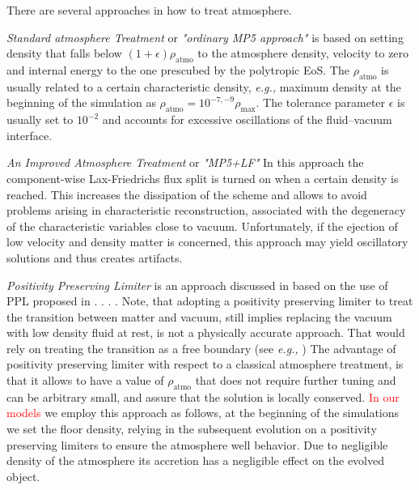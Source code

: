 There are several approaches in how to treat atmosphere. 

\textit{Standard atmosphere Treatment} or \textit{"ordinary MP5 approach"} is based on setting density that falls below $(1+\epsilon)\rho_{\text{atmo}}$ to the atmosphere density, velocity to zero and internal energy to the one prescubed by the polytropic EoS. The $\rho_{\text{atmo}}$ is usually related to a certain characteristic density, \textit{e.g.,} maximum density at the beginning of the simulation as $\rho_{\text{atmo}} = 10^{-7,-9}\rho_{\text{max}}$. The tolerance parameter $\epsilon$ is usually set to $10^{-2}$ and accounts for excessive oscillations of the fluid–vacuum interface. 

\textit{An Improved Atmosphere Treatment} or \textit{"MP5+LF"} In this approach the component-wise Lax-Friedrichs flux split is turned on when a certain density is reached. This increases the dissipation of the scheme and allows to avoid problems arising in characteristic reconstruction, associated with the degeneracy of the characteristic variables close to vacuum. Unfortunately, if the ejection of low velocity and density matter is concerned, this approach may yield oscillatory solutions and thus creates artifacts. 

\textit{Positivity Preserving Limiter} is an approach discussed in \cite{Radice:2013apa} based on the use of PPL proposed in \cite{Hu:2013}. . .
. 
Note, that adopting a positivity preserving limiter to treat the transition between matter and vacuum, still implies replacing the vacuum with low density fluid at rest, is not a physically accurate approach. That would rely on treating the transition as a free boundary (see \textit{e.g.,} \cite{Kastaun:2006}) The advantage of positivity preserving limiter with respect to a classical atmosphere treatment, is that it allows to have a value of $\rho_{\text{atmo}}$ that does not require further tuning and can be arbitrary small, and assure that the solution is locally conserved. 
\textcolor{red}{In our models} we employ this approach as follows, at the beginning of the simulations we set the floor density, relying in the subsequent evolution on a positivity preserving limiters to ensure the atmosphere well behavior. Due to negligible density of the atmosphere its accretion has a negligible effect on the evolved object. 

